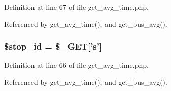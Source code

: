 Definition at line 67 of file get\_\-avg\_\-time.php.



Referenced by get\_\-avg\_\-time(), and get\_\-bus\_\-avg().

\hypertarget{get__avg__time_8php_addc5e9981ac50c577e366f562a9382fe_addc5e9981ac50c577e366f562a9382fe}{
\subsubsection[{\$stop\_\-id}]{\setlength{\rightskip}{0pt plus 5cm}\$stop\_\-id = \$\_\-GET\mbox{[}'s'\mbox{]}}}
\label{get__avg__time_8php_addc5e9981ac50c577e366f562a9382fe_addc5e9981ac50c577e366f562a9382fe}


Definition at line 66 of file get\_\-avg\_\-time.php.



Referenced by get\_\-avg\_\-time(), and get\_\-bus\_\-avg().

